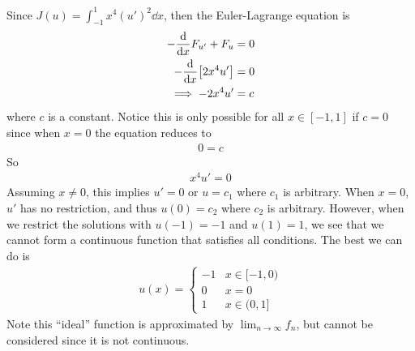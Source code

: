 \documentclass[12pt]{article}
\theoremstyle{plain}
\begin{document}
\begin{enumerate}[(a)]
    Since $J(u) = \int_{-1}^1 x^4 (u')^2 \dd x$, then the Euler-Lagrange equation is
    \begin{align*}
        -\frac{\dd}{\dd x} F_{u'} + F_u &= 0 \\
        -\frac{\dd}{\dd x}\qty[2x^4 u'] &= 0 \\
        \implies -2x^4 u' &= c
    \end{align*}
    where $c$ is a constant.  Notice this is only possible for all $x \in [-1, 1]$ if $c = 0$ since when $x = 0$ the equation reduces to
    \begin{align*}
        0 = c
    \end{align*}
    So
    \begin{align*}
        x^4 u' = 0
    \end{align*}
    Assuming $x \neq 0$, this implies $u' = 0$ or $u = c_1$ where $c_1$ is arbitrary.  When $x = 0$, $u'$ has no restriction, and thus $u(0) = c_2$ where $c_2$ is arbitrary.  However, when we restrict the solutions with $u(-1) = -1$ and $u(1) = 1$, we see that we cannot form a continuous function that satisfies all conditions.  The best we can do is
    \begin{align*}
        u(x) = \begin{cases}
            -1 & x \in [-1, 0) \\
            0 & x = 0 \\
            1 & x \in (0, 1]
        \end{cases}
    \end{align*}
    Note this ``ideal'' function is approximated by $\lim_{n\rightarrow \infty} f_n$, but cannot be considered since it is not continuous.
\end{enumerate}
\end{document}
